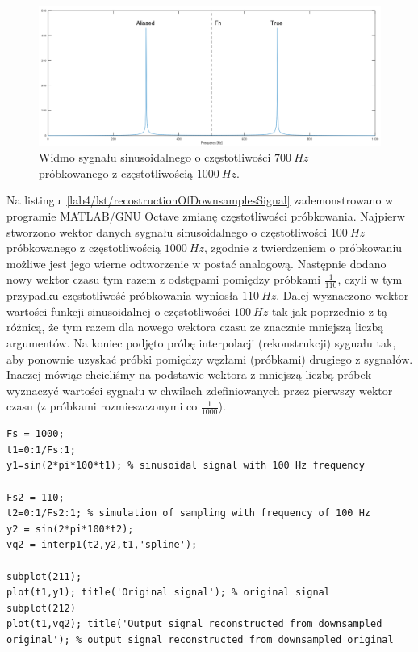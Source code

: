 \begin{figure}[hbt!]
	\centering
	\includegraphics[width=0.95\linewidth]{images/aliasedComponent.png}
	\caption{Widmo sygnału sinusoidalnego o częstotliwości $700~Hz$ próbkowanego z częstotliwością $1000~Hz$.}
	\label{lab4/fig/aliasedComponent}
\end{figure}

Na listingu~\ref{lab4/lst/recostructionOfDownsamplesSignal} zademonstrowano w programie MATLAB/GNU Octave zmianę częstotliwości próbkowania. Najpierw stworzono wektor danych sygnału sinusoidalnego o częstotliwości $100~Hz$ próbkowanego z częstotliwością $1000~Hz$, zgodnie z twierdzeniem o próbkowaniu możliwe jest jego wierne odtworzenie w postać analogową. Następnie dodano nowy wektor czasu tym razem z odstępami pomiędzy próbkami $\frac{1}{110}$, czyli w tym przypadku częstotliwość próbkowania wyniosła $110~Hz$. Dalej wyznaczono wektor wartości funkcji sinusoidalnej o częstotliwości $100~Hz$ tak jak poprzednio z tą różnicą, że tym razem dla nowego wektora czasu ze znacznie mniejszą liczbą argumentów. Na koniec podjęto próbę interpolacji (rekonstrukcji) sygnału tak, aby ponownie uzyskać próbki pomiędzy węzłami (próbkami) drugiego z sygnałów. Inaczej mówiąc chcieliśmy na podstawie wektora z mniejszą liczbą próbek wyznaczyć wartości sygnału w chwilach zdefiniowanych przez pierwszy wektor czasu (z próbkami rozmieszczonymi co $\frac{1}{1000}$).
\begin{lstlisting}[caption=Symulacja niedostatecznie wysokiej częstotliwości próbkowania, label=lab4/lst/recostructionOfDownsamplesSignal]
Fs = 1000;
t1=0:1/Fs:1;
y1=sin(2*pi*100*t1); % sinusoidal signal with 100 Hz frequency

Fs2 = 110;
t2=0:1/Fs2:1; % simulation of sampling with frequency of 100 Hz
y2 = sin(2*pi*100*t2);
vq2 = interp1(t2,y2,t1,'spline');

subplot(211);
plot(t1,y1); title('Original signal'); % original signal
subplot(212)
plot(t1,vq2); title('Output signal reconstructed from downsampled original'); % output signal reconstructed from downsampled original
\end{lstlisting}

